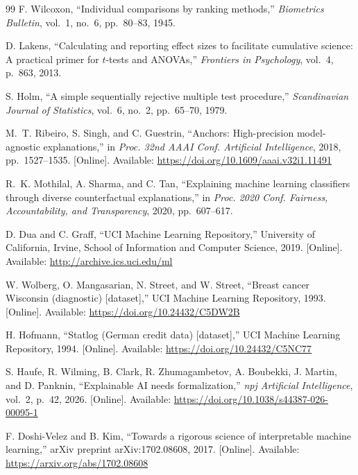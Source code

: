 \documentclass{cleiej}
\begin{document}
\begin{thebibliography}{99}
F. Wilcoxon, ``Individual comparisons by ranking methods,''
\emph{Biometrics Bulletin}, vol.~1, no.~6, pp.~80--83, 1945.

D. Lakens, ``Calculating and reporting effect sizes to facilitate
cumulative science: A practical primer for $t$-tests and ANOVAs,''
\emph{Frontiers in Psychology}, vol.~4, p.~863, 2013.

S. Holm, ``A simple sequentially rejective multiple test procedure,''
\emph{Scandinavian Journal of Statistics}, vol.~6, no.~2, pp.~65--70, 1979.

M.~T. Ribeiro, S. Singh, and C. Guestrin, ``Anchors: High-precision
model-agnostic explanations,'' in \emph{Proc. 32nd AAAI Conf. Artificial
Intelligence}, 2018, pp.~1527--1535. [Online]. Available:
\url{https://doi.org/10.1609/aaai.v32i1.11491}

R.~K. Mothilal, A. Sharma, and C. Tan, ``Explaining machine learning
classifiers through diverse counterfactual explanations,'' in \emph{Proc.
2020 Conf. Fairness, Accountability, and Transparency}, 2020, pp.~607--617.

D. Dua and C. Graff, ``UCI Machine Learning Repository,'' University of
California, Irvine, School of Information and Computer Science, 2019.
[Online]. Available: \url{http://archive.ics.uci.edu/ml}

W. Wolberg, O. Mangasarian, N. Street, and W. Street, ``Breast cancer
Wisconsin (diagnostic) [dataset],'' UCI Machine Learning Repository, 1993.
[Online]. Available: \url{https://doi.org/10.24432/C5DW2B}

H. Hofmann, ``Statlog (German credit data) [dataset],'' UCI Machine
Learning Repository, 1994. [Online]. Available:
\url{https://doi.org/10.24432/C5NC77}

S. Haufe, R. Wilming, B. Clark, R. Zhumagambetov, A. Boubekki, J. Martin,
and D. Panknin, ``Explainable AI needs formalization,'' \emph{npj
Artificial Intelligence}, vol.~2, p.~42, 2026. [Online]. Available:
\url{https://doi.org/10.1038/s44387-026-00095-1}

F. Doshi-Velez and B. Kim, ``Towards a rigorous science of interpretable
machine learning,'' arXiv preprint arXiv:1702.08608, 2017. [Online].
Available: \url{https://arxiv.org/abs/1702.08608}


\end{thebibliography}
\end{document}

